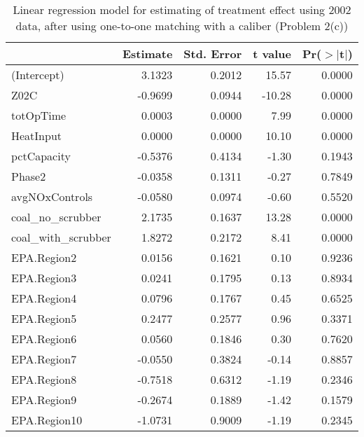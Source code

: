 \begin{table}[ht]
\centering
\begin{tabular}{lrrrr}
  \toprule
 & Estimate & Std. Error & t value & Pr($>$$|$t$|$) \\ 
  \midrule
(Intercept) & 3.1323 & 0.2012 & 15.57 & 0.0000 \\ 
  Z02C & -0.9699 & 0.0944 & -10.28 & 0.0000 \\ 
  totOpTime & 0.0003 & 0.0000 & 7.99 & 0.0000 \\ 
  HeatInput & 0.0000 & 0.0000 & 10.10 & 0.0000 \\ 
  pctCapacity & -0.5376 & 0.4134 & -1.30 & 0.1943 \\ 
  Phase2 & -0.0358 & 0.1311 & -0.27 & 0.7849 \\ 
  avgNOxControls & -0.0580 & 0.0974 & -0.60 & 0.5520 \\ 
  coal\_no\_scrubber & 2.1735 & 0.1637 & 13.28 & 0.0000 \\ 
  coal\_with\_scrubber & 1.8272 & 0.2172 & 8.41 & 0.0000 \\ 
  EPA.Region2 & 0.0156 & 0.1621 & 0.10 & 0.9236 \\ 
  EPA.Region3 & 0.0241 & 0.1795 & 0.13 & 0.8934 \\ 
  EPA.Region4 & 0.0796 & 0.1767 & 0.45 & 0.6525 \\ 
  EPA.Region5 & 0.2477 & 0.2577 & 0.96 & 0.3371 \\ 
  EPA.Region6 & 0.0560 & 0.1846 & 0.30 & 0.7620 \\ 
  EPA.Region7 & -0.0550 & 0.3824 & -0.14 & 0.8857 \\ 
  EPA.Region8 & -0.7518 & 0.6312 & -1.19 & 0.2346 \\ 
  EPA.Region9 & -0.2674 & 0.1889 & -1.42 & 0.1579 \\ 
  EPA.Region10 & -1.0731 & 0.9009 & -1.19 & 0.2345 \\ 
   \bottomrule
\end{tabular}
\caption{Linear regression model for estimating of treatment effect
  using 2002 data, after using one-to-one matching with a caliber
  (Problem 2(c))}
\label{tab:lm-2c-02}
\end{table}

